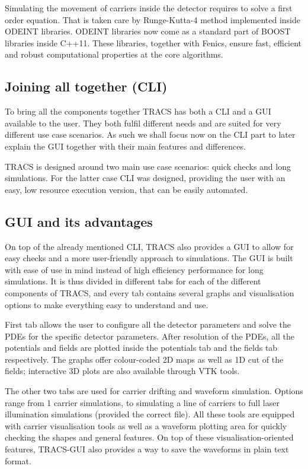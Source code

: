Simulating the movement of carriers inside the detector requires to solve a first order equation. That is taken care by Runge-Kutta-4 method implemented inside ODEINT libraries. ODEINT libraries now come as a standard part of BOOST libraries inside C++11. These libraries, together with Fenics, ensure fast, efficient and robust computational properties at the core algorithms.



\subsection{Joining all together (CLI)}

To bring all the components together TRACS has both a CLI and a GUI available to the user. They both fulfil different needs and are suited for very different use case scenarios. As such we shall focus now on the CLI part to later explain the GUI together with their main features and differences.

TRACS is designed around two main use case scenarios: quick checks and long simulations. For the latter case CLI was designed, providing the user with an easy, low resource execution version, that can be easily automated. 

\subsection{GUI and its advantages}

On top of the already mentioned CLI, TRACS also provides a GUI to allow for easy checks and a more user-friendly approach to simulations. The GUI is built with ease of use in mind instead of high efficiency performance for long simulations. It is thus divided in different tabs for each of the different components of TRACS, and every tab contains several graphs and visualisation options to make everything easy to understand and use.

First tab allows the user to configure all the detector parameters and solve the PDEs for the specific detector parameters. After resolution of the PDEs, all the potentials and fields are plotted inside the potentials tab and the fields tab respectively. The graphs offer colour-coded 2D maps as well as 1D cut of the fields; interactive 3D plots are also available through VTK tools.

The other two tabs are used for carrier drifting and waveform simulation. Options range from 1 carrier simulations, to simulating a line of carriers to full laser illumination simulations (provided the correct file). All these tools are equipped with carrier visualisation tools as well as a waveform plotting area for quickly checking the shapes and general features. On top of these visualisation-oriented features, TRACS-GUI also provides a way to save the waveforms in plain text format.

